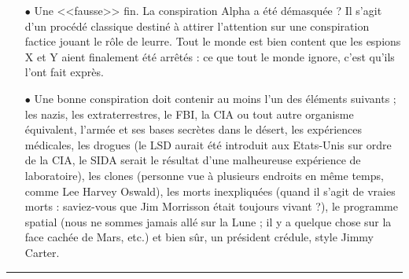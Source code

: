 \documentclass[11pt,twoside,a4paper]{article}
\begin{document}
\begin{multicols*}{2}
\begin{itemize}
	\item[$\bullet$] Une <<fausse>> fin. La conspiration Alpha a {\'e}t{\'e} d{\'e}masqu{\'e}e ? Il s'agit d'un proc{\'e}d{\'e} classique destin{\'e} {\`a} attirer l'attention sur une conspiration factice jouant le r{\^o}le de leurre. Tout le monde est bien content que les espions X et Y aient finalement {\'e}t{\'e} arr{\^e}t{\'e}s : ce que tout le monde ignore, c'est qu'ils l'ont fait expr{\`e}s. 
	\item[$\bullet$] Une bonne conspiration doit contenir au moins l'un des {\'e}l{\'e}ments suivants ; les nazis, les extraterrestres, le FBI, la CIA ou tout autre organisme {\'e}quivalent, l'arm{\'e}e et ses bases secr{\`e}tes dans le d{\'e}sert, les exp{\'e}riences m{\'e}dicales, les drogues (le LSD aurait {\'e}t{\'e} introduit aux Etats-Unis sur ordre de la CIA, le SIDA serait le r{\'e}sultat d'une malheureuse exp{\'e}rience de laboratoire), les clones (personne vue {\`a} plusieurs endroits en m{\^e}me temps, comme Lee Harvey Oswald), les morts inexpliqu{\'e}es (quand il s'agit de vraies morts : saviez-vous que Jim Morrisson {\'e}tait toujours vivant ?), le programme spatial (nous ne sommes jamais all{\'e} sur la Lune ; il y a quelque chose sur la face cach{\'e}e de Mars, etc.) et bien s{\^u}r, un pr{\'e}sident cr{\'e}dule, style Jimmy Carter. 
\end{itemize}
 
\begin{center} \rule{0.45\textwidth}{0.01cm} \end{center}


\end{multicols*}
\end{document}
